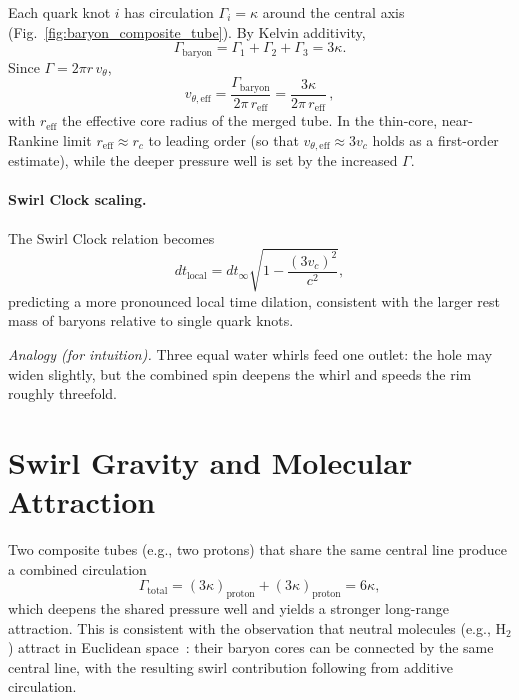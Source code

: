 \documentclass[reprint,aps,onecolumn,nofootinbib]{revtex4-2}
\begin{document}
    Each quark knot $i$ has circulation $\Gamma_i = \kappa$ around the central axis (Fig.~\ref{fig:baryon_composite_tube}).
        By Kelvin additivity,
        \begin{equation}
            \Gamma_{\mathrm{baryon}}=\Gamma_1+\Gamma_2+\Gamma_3=3\kappa.
        \end{equation}
        Since $\Gamma=2\pi r\,v_\theta$,
        \begin{equation}
            \boxed{\;
            v_{\theta,\mathrm{eff}}=\frac{\Gamma_{\mathrm{baryon}}}{2\pi\,r_{\mathrm{eff}}}
                =\frac{3\kappa}{2\pi\,r_{\mathrm{eff}}}\,,
                \;}\label{eq:baryon-vtheta}
        \end{equation}
        with $r_{\mathrm{eff}}$ the effective core radius of the merged tube. In the thin-core, near-Rankine limit $r_{\mathrm{eff}}\approx r_c$ to leading order (so that $v_{\theta,\mathrm{eff}}\approx 3 v_c$ holds as a first-order estimate), while the deeper pressure well is set by the increased $\Gamma$.

        \paragraph{Swirl Clock scaling.}
        The Swirl Clock relation becomes
        \begin{equation}
            dt_{\mathrm{local}} = dt_\infty \sqrt{1 - \frac{(3 v_c)^2}{c^2}},\label{eq:baryon-swirl-clock}
        \end{equation}
        predicting a more pronounced local time dilation, consistent with the larger rest mass of baryons relative to single quark knots.

            \emph{Analogy (for intuition).} Three equal water whirls feed one outlet: the hole may widen slightly, but the combined spin deepens the whirl and speeds the rim roughly threefold.





\section{Swirl Gravity and Molecular Attraction}
    Two composite tubes (e.g., two protons) that share the same central line produce a combined circulation
    \[
        \Gamma_{\mathrm{total}} = (3 \kappa)_{\mathrm{proton}} + (3 \kappa)_{\mathrm{proton}} = 6 \kappa,
    \]
    which deepens the shared pressure well and yields a stronger long-range attraction.
    This is consistent with the observation that neutral molecules (e.g., H$_2$) attract in Euclidean space~\cite{london1930,casimirpolder1948}: their baryon cores can be connected by the same central line, with the resulting swirl contribution following from additive circulation.
\end{document}

